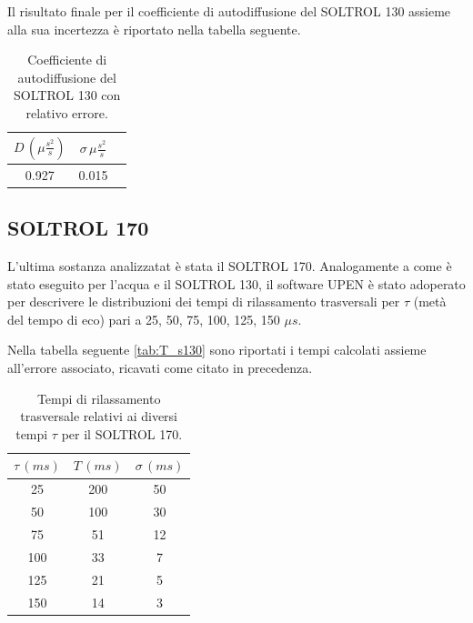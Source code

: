 Il risultato finale per il coefficiente di autodiffusione del SOLTROL 130 assieme alla sua incertezza è riportato nella tabella seguente.

\begin{table}[h!]
    \begin{center}
    \begin{tabular}{c c c}
    \toprule
    	$D\,({\mu}\frac{s^2}{s})$ & $\sigma\,{\mu}\frac{s^2}{s}$ \\
    \midrule
    	0.927	&	0.015	\\
    \bottomrule
    \end{tabular}
    \caption{Coefficiente di autodiffusione del SOLTROL 130 con relativo errore.}
    \label{tab:Df_s130}
    \end{center}
\end{table}


\subsection*{SOLTROL 170}

L'ultima sostanza analizzatat è stata il SOLTROL 170.
Analogamente a come è stato eseguito per l'acqua e il SOLTROL 130, il software UPEN è stato adoperato per descrivere le distribuzioni dei tempi di rilassamento trasversali per $\tau$ (metà del tempo di eco) pari a 25, 50, 75, 100, 125, 150 ${\mu}s$.

Nella tabella seguente \ref{tab:T_s130} sono riportati i tempi calcolati assieme all'errore associato, ricavati come citato in precedenza.

\begin{table}[h!]
    \begin{center}
    \begin{tabular}{c c c}
    \toprule
    	${\tau}\,(ms)$ & $T\,(ms)$ & ${\sigma}\,(ms)$ \\
    \midrule
	 25 & 200 & 50 \\
	 50 & 100 & 30 \\
	 75 & 51 & 12 \\
	 100 & 33 & 7 \\
	 125 & 21 & 5 \\
	 150 & 14 & 3 \\
    \bottomrule
    \end{tabular}
    \caption{Tempi di rilassamento trasversale relativi ai diversi tempi $\tau$ per il SOLTROL 170.}
    \label{tab:T_s170}
    \end{center}
\end{table}

